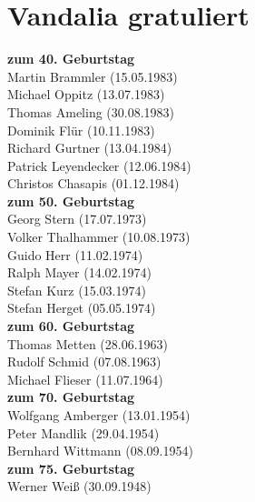 \section*{Vandalia gratuliert}

{\footnotesize

\begin{multicols}{2}
	




\textbf{zum 40. Geburtstag}\\
Martin Brammler 	(15.05.1983)\\
Michael Oppitz   (13.07.1983)\\
Thomas Ameling	(30.08.1983)\\
Dominik Flür  (10.11.1983)\\
Richard Gurtner (13.04.1984)\\
Patrick Leyendecker (12.06.1984)\\
Christos Chasapis (01.12.1984)\\



\textbf{zum 50. Geburtstag}\\
Georg Stern (17.07.1973)\\
Volker Thalhammer (10.08.1973)\\
Guido Herr (11.02.1974)\\
Ralph Mayer (14.02.1974)\\
Stefan Kurz (15.03.1974)\\
Stefan Herget (05.05.1974)\\



\textbf{zum 60. Geburtstag} \\
Thomas Metten (28.06.1963)\\
Rudolf Schmid (07.08.1963)\\
Michael Flieser (11.07.1964)\\


\textbf{zum 70. Geburtstag}\\
Wolfgang Amberger (13.01.1954)\\
Peter Mandlik (29.04.1954)\\
Bernhard Wittmann (08.09.1954)\\


\textbf{zum 75. Geburtstag}\\
Werner Weiß (30.09.1948)\\


\end{multicols}}
